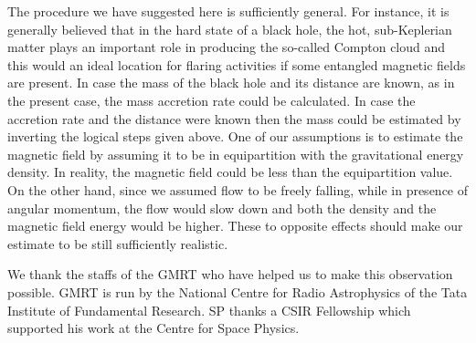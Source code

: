 \documentclass[referee]{cjaa}           %
\begin{document}
The procedure we have suggested here is sufficiently general.  For instance, it is 
generally believed that 
in the hard state of a black hole, the hot, sub-Keplerian matter plays an important role in
producing the so-called Compton cloud and this would an ideal location for flaring activities
if some entangled  magnetic fields are present.
In case the mass of the black hole and its distance are known, as in the present case, the
mass accretion rate could be calculated. In case the accretion rate and the distance were
known then the mass could be estimated by inverting the logical steps given above. One of 
our assumptions is to estimate the magnetic field by assuming it to be in equipartition
with the gravitational energy density. In reality, the magnetic field could be less
than the equipartition value. On the other hand, since we assumed flow to be freely 
falling, while in presence of angular momentum, the flow would slow down and both 
the density and the magnetic field energy would be higher. These to opposite effects 
should make our estimate to be still sufficiently realistic.

\acknowledgements We thank the staffs of the GMRT who have helped us to make this observation
possible. GMRT is run by the National Centre for Radio Astrophysics of the
Tata Institute of Fundamental Research. SP thanks a CSIR Fellowship which supported his
work at the Centre for Space Physics.
\end{document}

